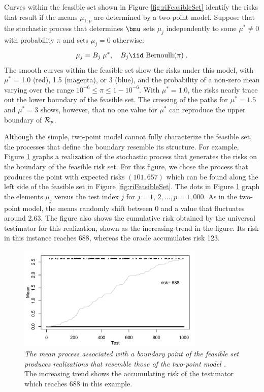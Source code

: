 \documentclass[12pt]{article}
\begin{document}
 Curves within the feasible set shown in Figure \ref{fig:riFeasibleSet} identify
 the risks that result if the means $\mu_{1:p}$ are determined by a two-point
 model.  Suppose that the stochastic process that determines $\bmu$
 sets $\mu_j$ independently to some $\mu^{*} \ne 0$ with probability $\pi$ and sets $\mu_j=0$ otherwise:
 \begin{equation}
    \mu_j = B_j \; \mu^{*}, \quad B_j  \iid \mbox{ Bernoulli}(\pi)  \;.
 \label{eq:muj}
 \end{equation}
 The smooth curves within the feasible set show the risks under this
 model, with $\mu^{*}$ = 1.0 (red), 1.5 (magenta), or 3 (blue),
 and the probability of a non-zero mean varying over the range $10^{-6} \le \pi
 \le 1-10^{-6}$.  With $\mu^{*} = 1.0$, the risks nearly trace out the lower
 boundary of the feasible set.  The crossing of the paths for $\mu^{*}=1.5$ and
 $\mu^{*}=3$ shows, however, that no one value for $\mu^{*}$ can reproduce the
 upper boundary of ${\cal R}_p$.


 Although the simple, two-point model  cannot fully characterize the feasible
 set, the processes that define the boundary resemble its structure.  For example, Figure
 \ref{fig:simRisk} graphs a realization of the stochastic process that generates the risks
 on the boundary of the feasible risk set.  For this figure, we chose the process that
 produces the point with expected risks $(101, 657)$ which can be found along the left
 side of the feasible set in Figure \ref{fig:riFeasibleSet}.  The dots in Figure
 \ref{fig:simRisk} graph the elements $\mu_j$ versus the test index $j$ for $j = 1,\,2,
 \ldots, p=1,000$.  As in the two-point model, the means randomly shift between 0 and a
 value that fluctuates around 2.63.  The figure also shows the cumulative risk obtained by
 the universal testimator for this realization, shown as the increasing trend in the
 figure.  Its risk in this instance reaches 688, whereas the oracle accumulates risk 123.


\begin{figure}
 \caption{ \label{fig:simRisk} {\sl The mean process associated with a boundary point of 
 the feasible set produces realizations that resemble those of the two-point model 
 .} The increasing trend shows the accumulating risk of the testimator 
 which reaches 688 in this example.  }

 \vspace{0.1in}
 \centerline{
 \includegraphics[width=3.5in]{figures/simRisk}    }
 \vspace{0.2in}
\end{figure}
\end{document}
